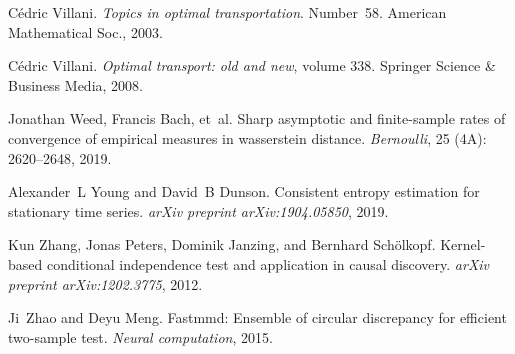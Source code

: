 \documentclass{article}
\theoremstyle{definition}
\begin{document}
\begin{thebibliography}{53}
C{\'e}dric Villani.
\newblock \emph{Topics in optimal transportation}.
\newblock Number~58. American Mathematical Soc., 2003.

C{\'e}dric Villani.
\newblock \emph{Optimal transport: old and new}, volume 338.
\newblock Springer Science \& Business Media, 2008.

Jonathan Weed, Francis Bach, et~al.
\newblock Sharp asymptotic and finite-sample rates of convergence of empirical
  measures in wasserstein distance.
\newblock \emph{Bernoulli}, 25 (4A): 2620--2648, 2019.

Alexander~L Young and David~B Dunson.
\newblock Consistent entropy estimation for stationary time series.
\newblock \emph{arXiv preprint arXiv:1904.05850}, 2019.

Kun Zhang, Jonas Peters, Dominik Janzing, and Bernhard Sch{\"o}lkopf.
\newblock Kernel-based conditional independence test and application in causal
  discovery.
\newblock \emph{arXiv preprint arXiv:1202.3775}, 2012.

Ji~Zhao and Deyu Meng.
\newblock Fastmmd: Ensemble of circular discrepancy for efficient two-sample
  test.
\newblock \emph{Neural computation}, 2015.

\end{thebibliography}



\appendix

\setcounter{figure}{0}
\setcounter{equation}{0}
\setcounter{theorem}{0}

\ifarxiv
\renewcommand{\thefigure}{A.\arabic{figure}}
\renewcommand{\theequation}{A.\arabic{equation}}
\renewcommand{\thetheorem}{A.\arabic{theorem}}
\else 
\renewcommand{\thefigure}{S.\arabic{figure}}
\renewcommand{\theequation}{S.\arabic{equation}}
\renewcommand{\thetheorem}{S.\arabic{theorem}}
\fi 




\ifarxiv
\else
\clearpage
\thispagestyle{empty}
\onecolumn
{}
\fi
\end{document}
